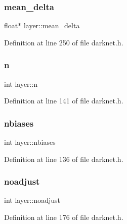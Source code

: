 \mbox{\label{structlayer_a6ae807c0129ad454f9a850e2e5c20544}} 
\subsubsection{\texorpdfstring{mean\_delta}{mean\_delta}}
{\footnotesize\ttfamily float$\ast$ layer\+::mean\+\_\+delta}



Definition at line 250 of file darknet.\+h.

\mbox{\label{structlayer_a454b8980d0186eb0095a25aadef41744}} 
\subsubsection{\texorpdfstring{n}{n}}
{\footnotesize\ttfamily int layer\+::n}



Definition at line 141 of file darknet.\+h.

\mbox{\label{structlayer_a8da8330f6a80f7fcb86fb2421c0484e5}} 
\subsubsection{\texorpdfstring{nbiases}{nbiases}}
{\footnotesize\ttfamily int layer\+::nbiases}



Definition at line 136 of file darknet.\+h.

\mbox{\label{structlayer_addd7dd5ca8a7ce6bb15aa2d06efe69ee}} 
\subsubsection{\texorpdfstring{noadjust}{noadjust}}
{\footnotesize\ttfamily int layer\+::noadjust}



Definition at line 176 of file darknet.\+h.

\mbox{\label{structlayer_ad10b4f2f32b1991c3cd8e66d138c5eaa}} 
